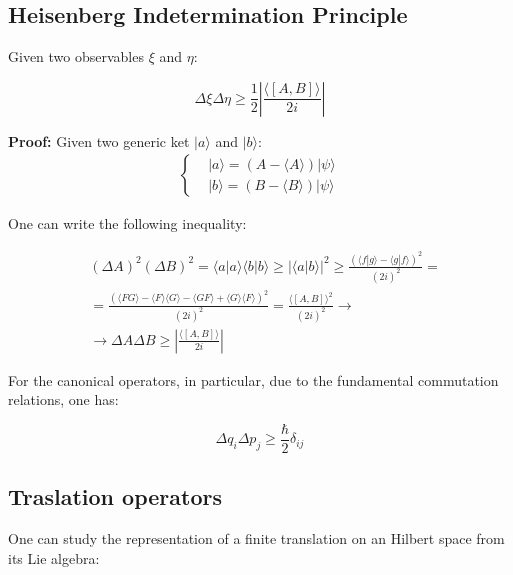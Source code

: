 \documentclass{article}
\begin{document}
\subsection{Heisenberg Indetermination Principle}

\begin{tcolorbox}[colframe=gray!50, colback=gray!10, coltitle=black, title=Heisenberg Indetermination Principle]
  Given two observables $\xi$ and $\eta$:

  \begin{equation}
    \Delta \xi \Delta \eta \geq \frac{1}{2}|\frac{\langle [A,B]\rangle }{2i}|
  \end{equation}

\end{tcolorbox}

\textbf{Proof:}
Given two generic ket $|a\rangle $ and $|b\rangle $:
\begin{align*}
  \left\{
  \begin{aligned}
     & |a\rangle=(A-\langle A\rangle)|\psi\rangle \\
     & |b\rangle=(B-\langle B\rangle)|\psi\rangle
  \end{aligned}
  \right.
\end{align*}

One can write the following inequality:

\begin{align*}
   & (\Delta A)^2(\Delta B)^2=\langle a|a\rangle\langle b|b\rangle \geq |\langle a|b\rangle |^2 \geq \frac{(\langle f|g\rangle -\langle g|f\rangle )^2}{(2i)^2}=                        \\
   & =\frac{(\langle FG\rangle -\langle F\rangle \langle G\rangle -\langle GF\rangle +\langle G\rangle \langle F\rangle )^2}{(2i)^2}=\frac{\langle [A,B]\rangle ^2}{(2i)^2} \rightarrow \\
   & \rightarrow \Delta A \Delta B \geq |\frac{\langle [A,B]\rangle }{2i}|
\end{align*}

For the canonical operators, in particular, due to the fundamental commutation relations, one has:

\begin{equation}
  \Delta q_i \Delta p_j\geq \frac{\hbar}{2}\delta_{ij}
\end{equation}

\subsection{Traslation operators}
One can study the representation of a finite translation on an Hilbert space
from its Lie algebra:
\end{document}
